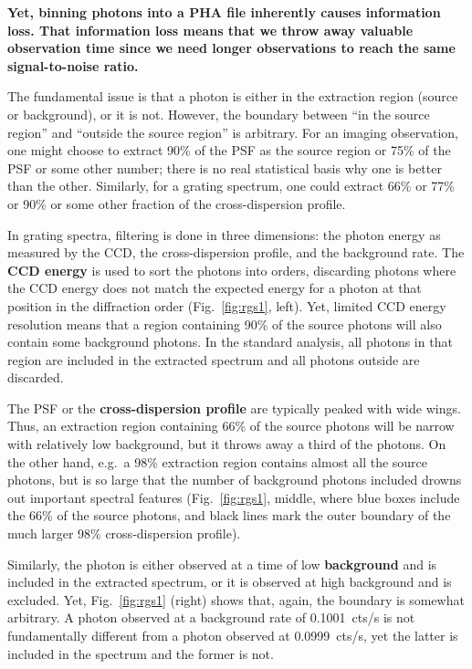 \documentclass[fleqn,12pt,onecolumn]{SelfArx} %
\begin{document}
\textbf{Yet, binning photons into a PHA file inherently causes information loss. That information loss means that we throw away valuable observation time since we need longer observations to reach the same signal-to-noise ratio.}

The fundamental issue is that a photon is either in the extraction region (source or background), or it is not. However, the boundary between ``in the source region'' and ``outside the source region'' is arbitrary. For an imaging observation, one might choose to extract 90\% of the PSF as the source region or 75\% of the PSF or some other number; there is no real statistical basis why one is better than the other. Similarly, for a grating spectrum, one could extract 66\% or 77\% or 90\% or some other fraction of the cross-dispersion profile.

In grating spectra, filtering is done in three dimensions: the photon energy as measured by the CCD, the cross-dispersion profile, and the background rate. The \textbf{CCD energy} is used to sort the photons into orders, discarding photons where the CCD energy does not match the expected energy for a photon at that position in the diffraction order (Fig.~\ref{fig:rgs1}, left). Yet, limited CCD energy resolution means that a region containing 90\% of the source photons will also contain some background photons. In the standard analysis, all photons in that region are included in the extracted spectrum and all photons outside are discarded.

The PSF or the \textbf{cross-dispersion profile} are typically peaked with wide wings. Thus, an extraction region containing 66\% of the source photons will be narrow with relatively low background, but it throws away a third of the photons. On the other hand, e.g.\ a 98\% extraction region contains almost all the source photons, but is so large that the number of background photons included drowns out important spectral features (Fig.~\ref{fig:rgs1}, middle, where blue boxes include the 66\% of the source photons, and black lines mark the outer boundary of the much larger 98\% cross-dispersion profile).

Similarly, the photon is either observed at a time of low \textbf{background} and is included in the extracted spectrum, or it is observed at high background and is excluded. Yet, Fig.~\ref{fig:rgs1} (right) shows that, again, the boundary is somewhat arbitrary. A photon observed at a background rate of 0.1001~cts/s is not fundamentally different from a photon observed at 0.0999~cts/s, yet the latter is included in the spectrum and the former is not.
\end{document}
